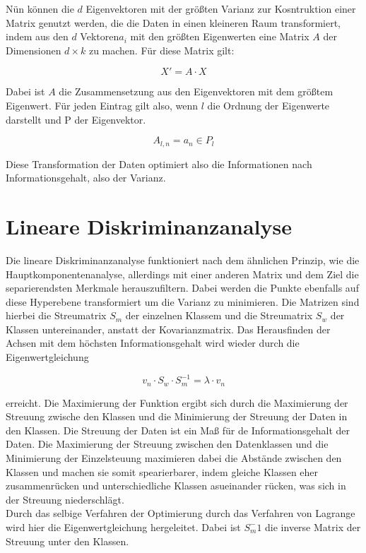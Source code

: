 \documentclass[11pt]{article} %
\begin{document}
Nün können die $d$ Eigenvektoren mit der größten Varianz zur Kosntruktion einer Matrix genutzt werden, die die Daten in einen kleineren
Raum transformiert, indem aus den $d$ Vektoren$a_i$ mit den größten Eigenwerten eine Matrix $A$ der Dimensionen $d \times k$ zu machen. Für diese Matrix gilt:

\begin{equation}
X' = A \cdot X
\end{equation}

Dabei ist $A$ die Zusammensetzung aus den Eigenvektoren mit dem größtem Eigenwert. Für jeden Eintrag gilt also, wenn $l$ die Ordnung der Eigenwerte darstellt und P der Eigenvektor.

\begin{equation}
A_{l,n} = a_n \in P_l
\end{equation}

Diese Transformation der Daten optimiert also die Informationen nach Informationsgehalt, also der Varianz.
 
\section{Lineare Diskriminanzanalyse}
Die lineare Diskriminanzanalyse funktioniert nach dem ähnlichen Prinzip, wie die Hauptkomponentenanalyse, allerdings mit einer anderen Matrix und dem Ziel die separierendsten Merkmale herauszufiltern. Dabei werden die Punkte ebenfalls auf diese Hyperebene transformiert um die Varianz zu minimieren. Die Matrizen sind hierbei die Streumatrix $S_m$ der einzelnen Klassem und die Streumatrix $S_w$ der Klassen untereinander, anstatt der Kovarianzmatrix. Das Herausfinden der Achsen mit dem höchsten Informationsgehalt wird wieder durch die Eigenwertgleichung 

\begin{equation}
v_n \cdot S_w \cdot S_m^{-1} = \lambda \cdot v_n
\end{equation} 

erreicht. Die Maximierung der Funktion ergibt sich durch die Maximierung der Streuung zwische den Klassen und die Minimierung der Streuung der Daten in den Klassen. Die Streuung der Daten ist ein Maß für de Informationsgehalt der Daten. Die Maximierung der Streuung zwischen den Datenklassen und die Minimierung der Einzelsteuung maximieren dabei die Abstände zwischen den Klassen und machen sie somit spearierbarer, indem gleiche Klassen eher zusammenrücken und unterschiedliche Klassen asueinander rücken, was sich in der Streuung niederschlägt.\\
Durch das selbige Verfahren der Optimierung durch das Verfahren von Lagrange wird hier die Eigenwertgleichung hergeleitet. Dabei ist $S_m^-1$ die inverse Matrix der Streuung unter den Klassen.
\end{document}

